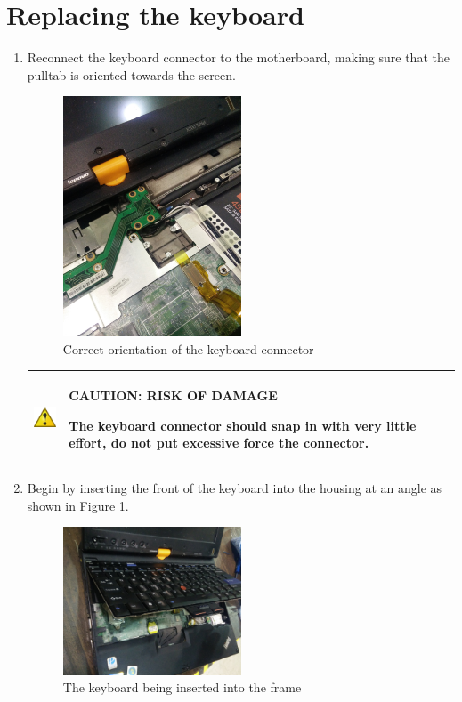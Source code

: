 \documentclass{article}
\newcommand{\alertwarningbox}[2]{
	\begin{center}
		\begin{tabularx}{0.9\linewidth}{| c X |}
			\hline
			\raisebox{\dimexpr2\baselineskip-\height}
			{\includegraphics[width=0.5in]{warning.png}}&
			\raisebox{\tabcolsep}{\strut}\par\textbf{#1}\par#2\raisebox{-\tabcolsep}{\strut} \\ \hline
		\end{tabularx}
	\end{center}
}
\begin{document}
\section*{Replacing the keyboard}
\begin{enumerate}
	\item Reconnect the keyboard connector to the motherboard, making sure that the pulltab is oriented towards the screen.
	\begin{figure}[H]
		\centering
		\includegraphics[width=0.5\textwidth]{reconnectkeyboard.jpg}
		\caption{Correct orientation of the keyboard connector}
	\end{figure}

	\alertwarningbox{CAUTION: RISK OF DAMAGE}{
		The keyboard connector should snap in with very little effort, do not put excessive force the connector.
	}

	\clearpage
	\item Begin by inserting the front of the keyboard into the housing at an angle as shown in Figure \ref{fig:angleinsert}.
	\begin{figure}[H]
		\centering
		\includegraphics[width=0.5\textwidth]{insertkeyboard.jpg}
		\caption{The keyboard being inserted into the frame}
		\label{fig:angleinsert}
	\end{figure}


\end{enumerate}
\end{document}
